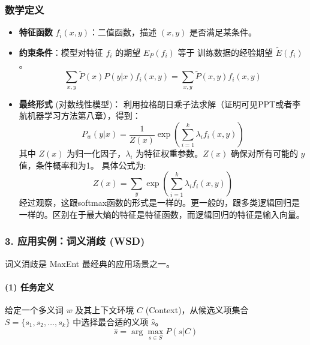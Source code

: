 \documentclass[a4paper, 11pt]{ctexart}
\begin{document}
\subsubsection{数学定义}
\begin{itemize}
    \item \textbf{特征函数} $f_i(x,y)$：二值函数，描述 $(x,y)$ 是否满足某条件。
    \item \textbf{约束条件}：模型对特征 $f_i$ 的期望 $E_P(f_i)$ 等于 训练数据的经验期望 $\tilde{E}(f_i)$。
    \begin{equation}
        \sum_{x,y} \tilde{P}(x)P(y|x)f_i(x,y) = \sum_{x,y} \tilde{P}(x,y)f_i(x,y)
    \end{equation}
    \item \textbf{最终形式} (对数线性模型)：
    利用拉格朗日乘子法求解（证明可见PPT或者李航机器学习方法第八章），得到：
    \begin{equation}
        P_w(y|x) = \frac{1}{Z(x)} \exp\left( \sum_{i=1}^{k} \lambda_i f_i(x,y) \right)
    \end{equation}
    其中 $Z(x)$ 为归一化因子，$\lambda_i$ 为特征权重参数。$Z(x)$ 确保对所有可能的 $y$ 值，条件概率和为1。
    具体公式为:
    \begin{equation}
        Z(x) = \sum_{y} \exp\left( \sum_{i=1}^{k} \lambda_i f_i(x,y) \right)
    \end{equation}
    经过观察，这跟softmax函数的形式是一样的。更一般的，跟多类逻辑回归是一样的。区别在于最大熵的特征是特征函数，而逻辑回归的特征是输入向量。
\end{itemize}

\subsubsection{3. 应用实例：词义消歧 (WSD)}
词义消歧是 MaxEnt 最经典的应用场景之一。

\paragraph{(1) 任务定义}
给定一个多义词 $w$ 及其上下文环境 $C$ (Context)，从候选义项集合 $S = \{s_1, s_2, \dots, s_k\}$ 中选择最合适的义项 $\hat{s}$。
$$ \hat{s} = \arg\max_{s \in S} P(s|C) $$
\end{document}

